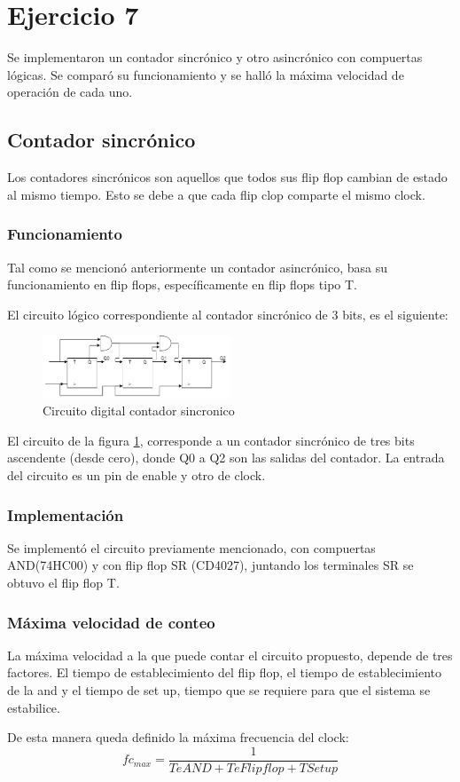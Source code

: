\documentclass[../../e3_tp2_main.tex]{subfiles}
\begin{document}
\section{Ejercicio 7}


Se implementaron un contador sincrónico y otro asincrónico con compuertas lógicas. Se comparó su funcionamiento y se halló la máxima velocidad de operación de cada uno.

\subsection{Contador sincr\'onico}
Los contadores sincrónicos son aquellos que todos sus flip flop cambian de estado al mismo tiempo. Esto se debe a que cada flip clop comparte el mismo clock.
\subsubsection{Funcionamiento}
Tal como se mencionó anteriormente un contador asincrónico, basa su funcionamiento en flip flops, específicamente en flip flops tipo T.
\par El circuito lógico correspondiente al contador sincrónico de 3 bits, es el siguiente:


\begin{figure}[H]	
	\centering
	\includegraphics[width=0.5\textwidth]{imagenes/cs_b.png}
	\caption{Circuito digital contador sincronico}\label{fig:cse}
\end{figure}
El circuito de la figura \ref{fig:cse}, corresponde a un contador sincrónico de tres bits ascendente (desde cero), donde Q0 a Q2 son las salidas del contador. La entrada del circuito es un pin de enable y otro de clock.

\subsubsection{Implementación}

Se implementó el circuito previamente mencionado, con compuertas AND(74HC00) y con flip flop SR (CD4027), juntando los terminales SR se obtuvo el flip flop T.

\subsubsection{Máxima velocidad de conteo}
La máxima velocidad a la que puede contar el circuito propuesto, depende de tres factores. El tiempo de establecimiento del flip flop, el tiempo de establecimiento de la and y el tiempo de set up, tiempo que se requiere para que el sistema se estabilice.
\par De esta manera queda definido la máxima frecuencia del clock:
$$fc_{max}=\frac{1}{TeAND +TeFlipflop +TSetup   } $$
\end{document}
